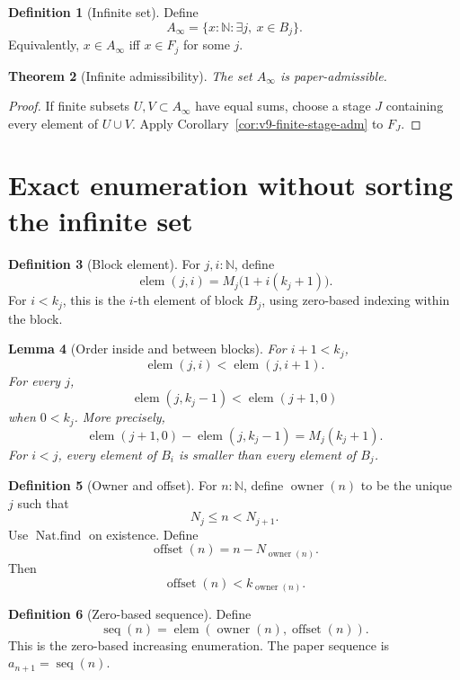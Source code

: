 \documentclass[11pt]{article}
\theoremstyle{definition}
\newtheorem{definition}{Definition}[section]
\theoremstyle{plain}
\newtheorem{theorem}[definition]{Theorem}
\newtheorem{lemma}[definition]{Lemma}
\theoremstyle{remark}
\newcommand{\N}{\mathbb{N}}
\newcommand{\elem}{\operatorname{elem}}
\newcommand{\owner}{\operatorname{owner}}
\newcommand{\offset}{\operatorname{offset}}
\newcommand{\seq}{\operatorname{seq}}
\begin{document}
\begin{definition}[Infinite set]\label{def:v9-infinite-set}
Define
\[
        A_\infty=\{x:\N:\exists j,\ x\in B_j\}.
\]
Equivalently, \(x\in A_\infty\) iff \(x\in F_j\) for some \(j\).
\end{definition}

\begin{theorem}[Infinite admissibility]\label{thm:v9-infinite-adm}
The set \(A_\infty\) is paper-admissible.
\end{theorem}

\begin{proof}
If finite subsets \(U,V\subset A_\infty\) have equal sums, choose a stage \(J\) containing every element of \(U\cup V\).  Apply Corollary~\ref{cor:v9-finite-stage-adm} to \(F_J\).
\end{proof}

\section{Exact enumeration without sorting the infinite set}

\begin{definition}[Block element]\label{def:v9-block-element}
For \(j,i:\N\), define
\[
        \elem(j,i)=M_j\bigl(1+i(k_j+1)\bigr).
\]
For \(i<k_j\), this is the \(i\)-th element of block \(B_j\), using zero-based indexing within the block.
\end{definition}

\begin{lemma}[Order inside and between blocks]\label{lem:v9-block-order}
For \(i+1<k_j\),
\[
        \elem(j,i)<\elem(j,i+1).
\]
For every \(j\),
\[
        \elem(j,k_j-1)<\elem(j+1,0)
\]
when \(0<k_j\).  More precisely,
\[
        \elem(j+1,0)-\elem(j,k_j-1)=M_j(k_j+1).
\]
For \(i<j\), every element of \(B_i\) is smaller than every element of \(B_j\).
\end{lemma}

\begin{definition}[Owner and offset]\label{def:v9-owner-offset}
For \(n:\N\), define \(\owner(n)\) to be the unique \(j\) such that
\[
        N_j\le n<N_{j+1}.
\]
Use \(\operatorname{Nat.find}\) on existence.  Define
\[
        \offset(n)=n-N_{\owner(n)}.
\]
Then
\[
        \offset(n)<k_{\owner(n)}.
\]
\end{definition}

\begin{definition}[Zero-based sequence]\label{def:v9-seq}
Define
\[
        \seq(n)=\elem(\owner(n),\offset(n)).
\]
This is the zero-based increasing enumeration.  The paper sequence is \(a_{n+1}=\seq(n)\).
\end{definition}
\end{document}
